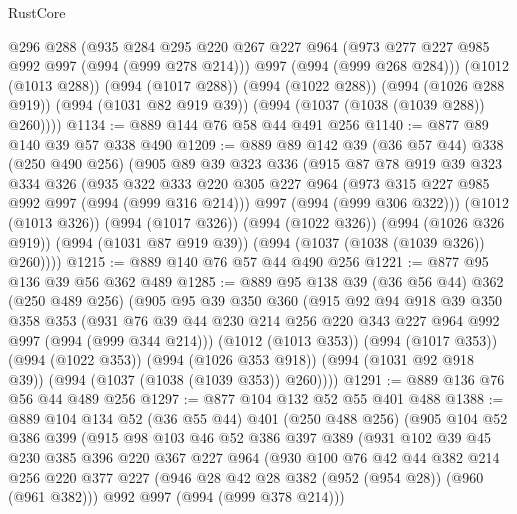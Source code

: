 \begin{lexlean}{RustCore}
\begin{coremodule}
        @296
        @288
        (@935
          @284
          @295
          @220
          @267
          @227
          @964
          (@973 @277 @227 @985 @992 @997 (@994 (@999 @278 @214)))
          @997
          (@994 (@999 @268 @284)))
        (@1012 (@1013 @288))
        (@994 (@1017 @288))
        (@994 (@1022 @288))
        (@994 (@1026 @288 @919))
        (@994 (@1031 @82 @919 @39))
        (@994 (@1037 (@1038 (@1039 @288)) @260))))
@1134 := @889 @144 @76 @58 @44 @491 @256
@1140 := @877 @89 @140 @39 @57 @338 @490
@1209 := @889
    @89
    @142
    @39
    (@36 @57 @44)
    @338
    (@250 @490 @256)
    (@905
      @89
      @39
      @323
      @336
      (@915
        @87
        @78
        @919
        @39
        @323
        @334
        @326
        (@935
          @322
          @333
          @220
          @305
          @227
          @964
          (@973 @315 @227 @985 @992 @997 (@994 (@999 @316 @214)))
          @997
          (@994 (@999 @306 @322)))
        (@1012 (@1013 @326))
        (@994 (@1017 @326))
        (@994 (@1022 @326))
        (@994 (@1026 @326 @919))
        (@994 (@1031 @87 @919 @39))
        (@994 (@1037 (@1038 (@1039 @326)) @260))))
@1215 := @889 @140 @76 @57 @44 @490 @256
@1221 := @877 @95 @136 @39 @56 @362 @489
@1285 := @889
    @95
    @138
    @39
    (@36 @56 @44)
    @362
    (@250 @489 @256)
    (@905
      @95
      @39
      @350
      @360
      (@915
        @92
        @94
        @918
        @39
        @350
        @358
        @353
        (@931 @76 @39 @44 @230 @214 @256 @220 @343 @227 @964 @992 @997 (@994 (@999 @344 @214)))
        (@1012 (@1013 @353))
        (@994 (@1017 @353))
        (@994 (@1022 @353))
        (@994 (@1026 @353 @918))
        (@994 (@1031 @92 @918 @39))
        (@994 (@1037 (@1038 (@1039 @353)) @260))))
@1291 := @889 @136 @76 @56 @44 @489 @256
@1297 := @877 @104 @132 @52 @55 @401 @488
@1388 := @889
    @104
    @134
    @52
    (@36 @55 @44)
    @401
    (@250 @488 @256)
    (@905
      @104
      @52
      @386
      @399
      (@915
        @98
        @103
        @46
        @52
        @386
        @397
        @389
        (@931
          @102
          @39
          @45
          @230
          @385
          @396
          @220
          @367
          @227
          @964
          (@930
            @100
            @76
            @42
            @44
            @382
            @214
            @256
            @220
            @377
            @227
            (@946 @28 @42 @28 @382 (@952 (@954 @28)) (@960 (@961 @382)))
            @992
            @997
            (@994 (@999 @378 @214)))

\end{coremodule}
\end{lexlean}
